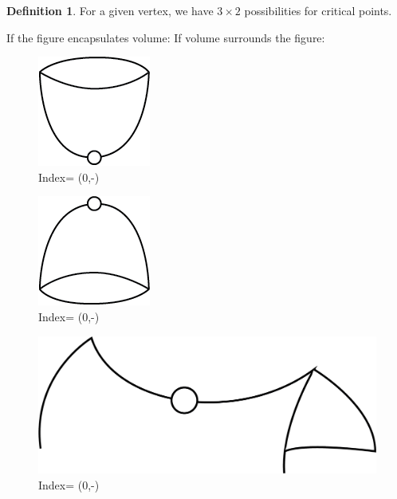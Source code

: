 \documentclass[a4paper]{article}
\theoremstyle{theorem}
\theoremstyle{definition}
\newtheorem{definition}{Definition} [section]
\theoremstyle{remark}
\theoremstyle{gremark}
\theoremstyle{discussion}
\theoremstyle{notation}
\begin{document}
\begin{definition}
	
	For a given vertex, we have $3\times 2$ possibilities for critical points.
	
	If the figure encapsulates volume:
	If volume surrounds the figure: 
	
	\begin{figure}[ht]
		\centering
		\includegraphics[scale=0.5]{minima.png}
		\caption{Index= (0,-)}
	\end{figure}

	\begin{figure}[ht]
		\centering
		\includegraphics[scale=0.5]{maxima.png}
		\caption{Index= (0,-)}
	\end{figure}
	
	\begin{figure}[ht]
		\centering
		\includegraphics[scale=0.5]{saddle_point.png}
		\caption{Index= (0,-)}
	\end{figure}
	
\end{definition}

\pagebreak
\end{document}
